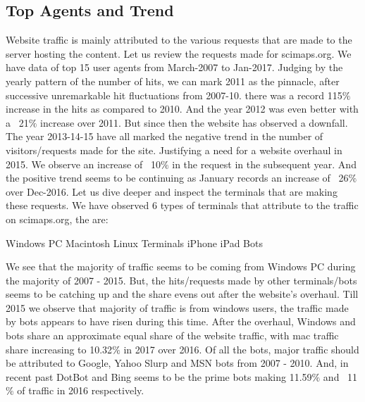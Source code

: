 \subsection{Top Agents and Trend} \label{viztopagents}
Website traffic is mainly attributed to the  various requests that are made to the server hosting the content. Let us review the requests made for scimaps.org. 
We have data of top 15 user agents from March-2007 to Jan-2017.  
Judging by the yearly pattern of the number of hits, we can mark 2011 as the pinnacle, after successive unremarkable hit fluctuations from 2007-10. there was a record 115$\%$ increase in the hits as compared to 2010. And the year 2012 was even better with a ~21$\%$ increase over 2011. But since then the website has observed a downfall. The year 2013-14-15 have all marked the negative trend in the number of visitors/requests made for the site. Justifying a need for a website overhaul in 2015. We observe an increase of ~10$\%$ in the request in the subsequent year. And the positive trend seems to be continuing as January records an increase of ~26$\%$  over Dec-2016.
Let us dive deeper and inspect the terminals that are making these requests. We have observed 6 types of terminals that attribute to the traffic on scimaps.org, the are:
\begin{itemize}
\Item Windows PC
\Item Macintosh
\Item Linux Terminals
\Item iPhone
\Item iPad
\Item Bots
\end{itemize}
We see that the majority of traffic seems to be coming from Windows PC during the majority of 2007 - 2015. But, the hits/requests made by other terminals/bots seems to be catching up and the share evens out after the website’s overhaul. Till 2015 we observe that majority of traffic is from windows users, the traffic made by bots appears to have risen during this time. After the overhaul, Windows and bots share an approximate equal share of the website traffic, with mac traffic share increasing to 10.32$\%$ in 2017 over 2016. 
Of all the bots, major traffic should be attributed to Google, Yahoo Slurp and MSN bots from 2007 - 2010. And, in recent past DotBot and Bing seems to be the prime bots making 11.59$\%$ and ~11$\%$ of traffic in 2016 respectively.
